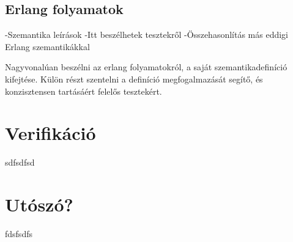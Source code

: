 \documentclass[twoside, a4paper, 12pt]{article}
\begin{document}
\subsection{Erlang folyamatok}

    -Szemantika leírások
    -Itt beszélhetek tesztekről
    -Összehasonlítás más eddigi Erlang szemantikákkal
    
    Nagyvonalúan beszélni az erlang folyamatokról, a saját
szemantikadefiníció kifejtése. Külön részt szentelni a definíció megfogalmazását segítő, és
konzisztensen tartásáért felelős tesztekért.

\section{Verifikáció}
sdfsdfsd

\section{Utószó?}
fdsfsdfs


\newpage

\printbibliography[title = {Referencia}]
\end{document}

